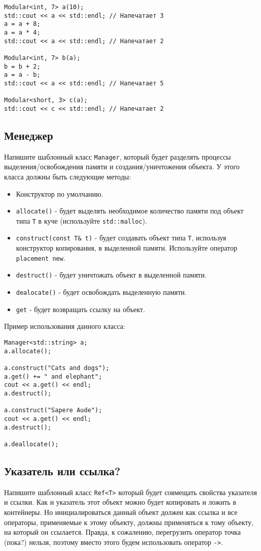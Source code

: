 \documentclass{article}
\begin{document}
\begin{lstlisting}
Modular<int, 7> a(10);
std::cout << a << std::endl; // Напечатает 3
a = a + 8;
a = a * 4;
std::cout << a << std::endl; // Напечатает 2

Modular<int, 7> b(a);
b = b + 2;
a = a - b;
std::cout << a << std::endl; // Напечатает 5

Modular<short, 3> с(a);
std::cout << c << std::endl; // Напечатает 2
\end{lstlisting}



\subsection{Менеджер}
Напишите шаблонный класс \texttt{Manager}, который будет разделять процессы выделения/освобождения памяти и создания/уничтожения объекта. У этого класса должны быть следующие методы:
\begin{itemize}
\item Конструктор по умолчанию.
\item \texttt{allocate()} - будет выделять необходимое количество памяти под объект типа \texttt{T} в куче (используйте \texttt{std::malloc}).
\item \texttt{construct(const T\& t)} - будет создавать объект типа \texttt{T}, используя конструктор копирования, в выделенной памяти. Используйте оператор \texttt{placement new}.
\item \texttt{destruct()} - будет уничтожать объект в выделенной памяти.
\item \texttt{dealocate()} - будет освобождать выделенную памяти.
\item \texttt{get} - будет возвращать ссылку на объект.
\end{itemize}
Пример использования данного класса:
\begin{lstlisting}
Manager<std::string> a;
a.allocate();

a.construct("Cats and dogs");
a.get() += " and elephant";
cout << a.get() << endl;
a.destruct();

a.construct("Sapere Aude");
cout << a.get() << endl;
a.destruct();

a.deallocate();
\end{lstlisting}


\newpage
\subsection{Указатель или ссылка?}
Напишите шаблонный класс \texttt{Ref<T>} который будет совмещать свойства указателя и ссылки. Как и указатель этот объект можно будет копировать и ложить в контейнеры. Но инициалироваться данный объект должен как ссылка и все операторы, применяемые к этому объекту, должны применяться к тому объекту, на который он ссылается. Правда, к сожалению, перегрузить оператор точка (пока?) нельзя, поэтому вместо этого будем использовать оператор \texttt{->}.
\end{document}
